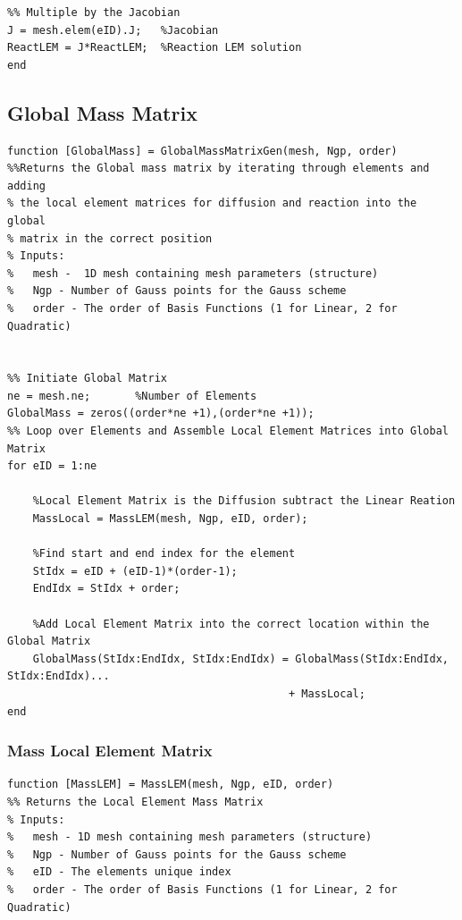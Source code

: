 \documentclass[11pt]{article}
\begin{document}
\begin{appendices}
\begin{lstlisting}
%% Multiple by the Jacobian
J = mesh.elem(eID).J;   %Jacobian 
ReactLEM = J*ReactLEM;  %Reaction LEM solution
end

\end{lstlisting}
\pagebreak


\subsection{Global Mass Matrix}\label{ap:Mass}

\begin{lstlisting}
function [GlobalMass] = GlobalMassMatrixGen(mesh, Ngp, order)
%%Returns the Global mass matrix by iterating through elements and adding
% the local element matrices for diffusion and reaction into the global
% matrix in the correct position
% Inputs:
%   mesh -  1D mesh containing mesh parameters (structure)
%   Ngp - Number of Gauss points for the Gauss scheme
%   order - The order of Basis Functions (1 for Linear, 2 for Quadratic)


%% Initiate Global Matrix
ne = mesh.ne;       %Number of Elements
GlobalMass = zeros((order*ne +1),(order*ne +1));  
%% Loop over Elements and Assemble Local Element Matrices into Global Matrix
for eID = 1:ne
        
    %Local Element Matrix is the Diffusion subtract the Linear Reation
    MassLocal = MassLEM(mesh, Ngp, eID, order);
    
    %Find start and end index for the element
    StIdx = eID + (eID-1)*(order-1);
    EndIdx = StIdx + order;
    
    %Add Local Element Matrix into the correct location within the Global Matrix
    GlobalMass(StIdx:EndIdx, StIdx:EndIdx) = GlobalMass(StIdx:EndIdx, StIdx:EndIdx)...
                                            + MassLocal;
end
\end{lstlisting}
\pagebreak

\subsubsection{Mass Local Element Matrix}\label{ap:MassElem}

\begin{lstlisting}
function [MassLEM] = MassLEM(mesh, Ngp, eID, order)
%% Returns the Local Element Mass Matrix
% Inputs:
%   mesh - 1D mesh containing mesh parameters (structure)
%   Ngp - Number of Gauss points for the Gauss scheme
%   eID - The elements unique index
%   order - The order of Basis Functions (1 for Linear, 2 for Quadratic)


\end{lstlisting}
\end{appendices}
\end{document}
